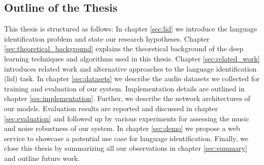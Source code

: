 \subsection{Outline of the Thesis}
This thesis is structured as follows: In chapter \ref{sec:lid} we introduce the language identification problem and state our research hypotheses. Chapter \ref{sec:theoretical_background} explains the theoretical background of the deep learning techniques and algorithms used in this thesis. Chapter \ref{sec:related_work} introduces related work and alternative approaches to the language identification (\ac{lid}) task. In chapter \ref{sec:datasets} we describe the audio datasets we collected for training and evaluation of our system. Implementation details are outlined in chapter \ref{sec:implementation}. Further, we describe the network architectures of our models. Evaluation results are reported and discussed in chapter \ref{sec:evaluation} and followed up by various experiments for assessing the music and noise robustness of our system. In chapter \ref{sec:demo} we propose a web service to showcase a potential use case for language identification. Finally, we close this thesis by summarizing all our observations in chapter \ref{sec:summary} and outline future work.
